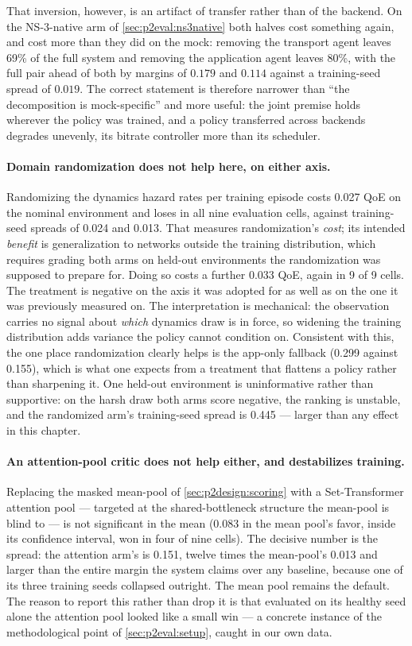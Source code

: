 That inversion, however, is an artifact of transfer rather than of the backend. On the NS-3-native arm
of \cref{sec:p2eval:ns3native} both halves cost something again, and cost more than they did on the
mock: removing the transport agent leaves 69\% of the full system and removing the application agent
leaves 80\%, with the full pair ahead of both by margins of $0.179$ and $0.114$ against a training-seed
spread of $0.019$. The correct statement is therefore narrower than ``the decomposition is
mock-specific'' and more useful: the joint premise holds wherever the policy was trained, and a policy
transferred across backends degrades unevenly, its bitrate controller more than its scheduler.

\paragraph{Domain randomization does not help here, on either axis.} Randomizing the dynamics hazard
rates per training episode costs 0.027 QoE on the nominal environment and loses in all nine evaluation
cells, against training-seed spreads of 0.024 and 0.013. That measures randomization's \emph{cost}; its
intended \emph{benefit} is generalization to networks outside the training distribution, which requires
grading both arms on held-out environments the randomization was supposed to prepare for. Doing so costs
a further 0.033 QoE, again in 9 of 9 cells. The treatment is negative on the axis it was adopted for as
well as on the one it was previously measured on. The interpretation is mechanical: the observation
carries no signal about \emph{which} dynamics draw is in force, so widening the training distribution
adds variance the policy cannot condition on. Consistent with this, the one place randomization clearly
helps is the app-only fallback (0.299 against 0.155), which is what one expects from a treatment that
flattens a policy rather than sharpening it. One held-out environment is uninformative rather than
supportive: on the harsh draw both arms score negative, the ranking is unstable, and the randomized
arm's training-seed spread is 0.445 --- larger than any effect in this chapter.

\paragraph{An attention-pool critic does not help either, and destabilizes training.} Replacing the
masked mean-pool of \cref{sec:p2design:scoring} with a Set-Transformer attention pool --- targeted at
the shared-bottleneck structure the mean-pool is blind to --- is not significant in the mean (0.083 in
the mean pool's favor, inside its confidence interval, won in four of nine cells). The decisive number
is the spread: the attention arm's is 0.151, twelve times the mean-pool's 0.013 and larger than the
entire margin the system claims over any baseline, because one of its three training seeds collapsed
outright. The mean pool remains the default. The reason to report this rather than drop it is that
evaluated on its healthy seed alone the attention pool looked like a small win --- a concrete instance
of the methodological point of \cref{sec:p2eval:setup}, caught in our own data.

